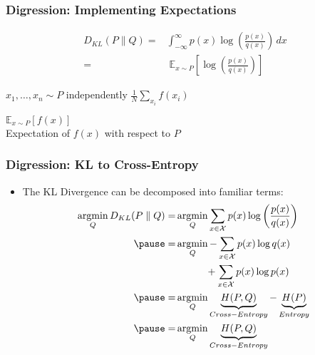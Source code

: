 \documentclass{beamer}
\DeclareMathOperator*{\argmin}{argmin}
\begin{document}
\begin{frame}
  \frametitle{Digression: Implementing Expectations}
    \begin{equation*}
      \begin{aligned}
      D_{KL} (P \parallel Q) =& \int_{-\infty}^{\infty} p(x)\log \left({\frac {p(x)}{q(x)}}\right)\,dx \\
      =& \; \mathbb{E}_{x \sim P} \left[ \log \left( \frac{p(x)}{q(x)} \right) \right]
      \end{aligned}
    \end{equation*}
    \pause
    \begin{algorithm}[H]
    \begin{algorithmic}[1]
      \STATE $x_1, \hdots, x_n \sim P$ independently
      \RETURN $\frac{1}{N}\sum_{x_i} f(x_i)$
    \end{algorithmic}
    \caption{$\mathbb{E}_{x \sim P}[f(x)]$\\Expectation of $f(x)$ with respect to $P$}
    \end{algorithm}
\end{frame}


\begin{frame}
  \frametitle{Digression: KL to Cross-Entropy}
  \begin{itemize}
    \item The KL Divergence can be decomposed into familiar terms:
    \begin{equation*}
      \begin{aligned}
        \argmin_{Q} D_{KL} (P \parallel Q) =& \argmin_{Q} \sum_{x \in \mathcal {X}} p(x)\log \left({\frac {p(x)}{q(x)}}\right) \\
        \pause
        =& \argmin_{Q} - \sum_{x \in \mathcal {X}} p(x)\log q(x) \\
        & \quad\quad\quad + \sum_{x \in \mathcal {X}} p(x)\log p(x) \\
        \pause
        =& \argmin_{Q} \underbrace{H(P, Q)}_{Cross-Entropy} - \underbrace{H(P)}_{Entropy} \\
        \pause
        =& \argmin_{Q} \underbrace{H(P, Q)}_{Cross-Entropy}
      \end{aligned}
    \end{equation*}
  \end{itemize}
\end{frame}
\end{document}
